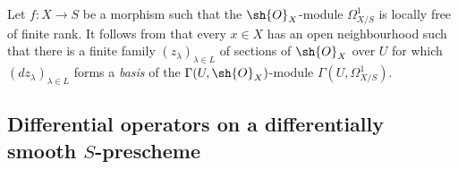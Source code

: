 \begin{remark}[16.10.6]
\label{IV.16.10.6}
Let $f:X \to S$ be a morphism such that the $\sh{O}_X$-module $\Omega_{X/S}^1$ is locally free of finite rank.
It follows from  that every $x \in X$ has an open neighbourhood such that there is a finite family $(z_\lambda)_{\lambda \in L}$ of sections of $\sh{O}_X$ over $U$ for which $(dz_\lambda)_{\lambda \in L}$ forms a \emph{basis} of the $\Gamma(U, \sh{O}_X)$-module $\Gamma(U, \Omega_{X/S}^1)$.
\end{remark}

\subsection{Differential operators on a differentially smooth $S$-prescheme}
\label{IV.16.11}

